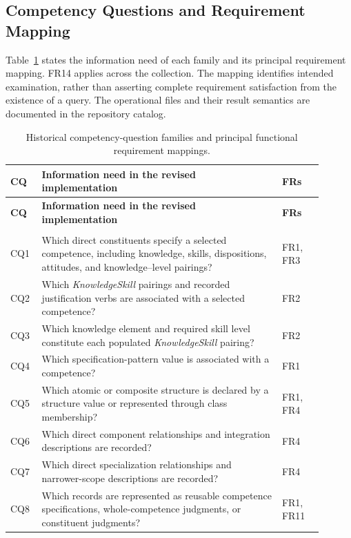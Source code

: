 \subsection{Competency Questions and Requirement Mapping}

Table~\ref{tab:traceability-cq-fr} states the information need of each
family and its principal requirement mapping. FR14 applies across the
collection. The mapping identifies intended examination, rather than
asserting complete requirement satisfaction from the existence of a
query. The operational files and their result semantics are documented
in the repository catalog.

\begingroup
\small
\begin{longtable}{p{0.08\linewidth} p{0.70\linewidth} p{0.12\linewidth}}
\caption{Historical competency-question families and principal functional requirement mappings.}
\label{tab:traceability-cq-fr} \\
\toprule
\textbf{CQ} & \textbf{Information need in the revised implementation} & \textbf{FRs} \\
\midrule
\endfirsthead
\toprule
\textbf{CQ} & \textbf{Information need in the revised implementation} & \textbf{FRs} \\
\midrule
\endhead
\bottomrule
\endfoot
\multicolumn{3}{l}{\textbf{A. Competence Specifications and Structure}} \\
\midrule
CQ1 & Which direct constituents specify a selected competence, including knowledge, skills, dispositions, attitudes, and knowledge--level pairings? & FR1, FR3 \\
CQ2 & Which \textit{KnowledgeSkill} pairings and recorded justification verbs are associated with a selected competence? & FR2 \\
CQ3 & Which knowledge element and required skill level constitute each populated \textit{KnowledgeSkill} pairing? & FR2 \\
CQ4 & Which specification-pattern value is associated with a competence? & FR1 \\
CQ5 & Which atomic or composite structure is declared by a structure value or represented through class membership? & FR1, FR4 \\
CQ6 & Which direct component relationships and integration descriptions are recorded? & FR4 \\
CQ7 & Which direct specialization relationships and narrower-scope descriptions are recorded? & FR4 \\
CQ8 & Which records are represented as reusable competence specifications, whole-competence judgments, or constituent judgments? & FR1, FR11 \\

\end{longtable}

